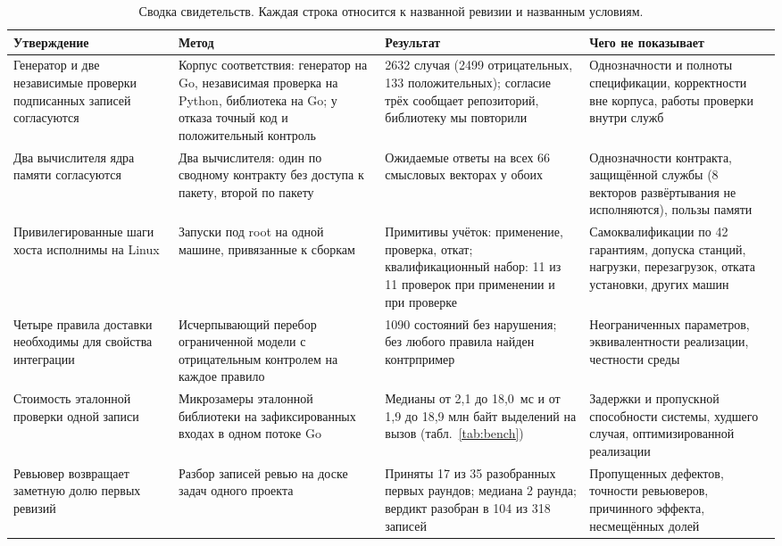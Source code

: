 \documentclass[10pt,a4paper]{article}
\begin{document}
\begin{table}[t]
\centering\small
\caption{Сводка свидетельств. Каждая строка относится к названной ревизии и названным условиям.}
\label{tab:evidence}
\footnotesize
\begin{tabular}{L{3.0cm}L{4.5cm}L{4.3cm}L{3.5cm}}
\toprule
Утверждение & Метод & Результат & Чего не показывает \\
\midrule
Генератор и две независимые проверки подписанных записей согласуются & Корпус соответствия: генератор на Go, независимая проверка на Python, библиотека на Go; у отказа точный код и положительный контроль & 2632 случая (2499 отрицательных, 133 положительных); согласие трёх сообщает репозиторий, библиотеку мы повторили & Однозначности и полноты спецификации, корректности вне корпуса, работы проверки внутри служб \\
\addlinespace
Два вычислителя ядра памяти согласуются & Два вычислителя: один по сводному контракту без доступа к пакету, второй по пакету & Ожидаемые ответы на всех 66 смысловых векторах у обоих & Однозначности контракта, защищённой службы (8 векторов развёртывания не исполняются), пользы памяти \\
\addlinespace
Привилегированные шаги хоста исполнимы на Linux & Запуски под root на одной машине, привязанные к сборкам & Примитивы учёток: применение, проверка, откат; квалификационный набор: 11 из 11 проверок при применении и при проверке & Самоквалификации по 42 гарантиям, допуска станций, нагрузки, перезагрузок, отката установки, других машин \\
\addlinespace
Четыре правила доставки необходимы для свойства интеграции & Исчерпывающий перебор ограниченной модели с отрицательным контролем на каждое правило & 1090 состояний без нарушения; без любого правила найден контрпример & Неограниченных параметров, эквивалентности реализации, честности среды \\
\addlinespace
Стоимость эталонной проверки одной записи & Микрозамеры эталонной библиотеки на зафиксированных входах в одном потоке Go & Медианы от 2,1 до 18,0~мс и от 1,9 до 18,9 млн байт выделений на вызов (табл.~\ref{tab:bench}) & Задержки и пропускной способности системы, худшего случая, оптимизированной реализации \\
\addlinespace
Ревьювер возвращает заметную долю первых ревизий & Разбор записей ревью на доске задач одного проекта & Приняты 17 из 35 разобранных первых раундов; медиана 2 раунда; вердикт разобран в 104 из 318 записей & Пропущенных дефектов, точности ревьюверов, причинного эффекта, несмещённых долей \\
\bottomrule
\end{tabular}
\end{table}
\end{document}
